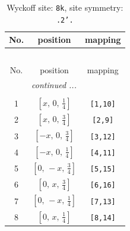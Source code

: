 \documentclass[fleqn,8pt]{jsarticle}
\begin{document}
\begin{longtable}{ccc}
\caption{Wyckoff site: {\tt 8k}, site symmetry: {\tt .2'.}}
 \\
 \hline \hline
No. & position & mapping \\ \hline \endfirsthead

\multicolumn{2}{l}{\tablename\ \thetable{}} \\
 \hline \hline
No. & position & mapping \\ \hline \endhead

 \hline \hline
\multicolumn{2}{r}{\footnotesize\it continued ...} \\ \endfoot

 \hline \hline
\multicolumn{2}{r}{} \\ \endlastfoot

1 & $\left[ x,\, 0,\, \frac{1}{4} \right]$ & {\tt [1,10]} \\ \hline
2 & $\left[ x,\, 0,\, \frac{3}{4} \right]$ & {\tt [2,9]} \\ \hline
3 & $\left[ - x,\, 0,\, \frac{3}{4} \right]$ & {\tt [3,12]} \\ \hline
4 & $\left[ - x,\, 0,\, \frac{1}{4} \right]$ & {\tt [4,11]} \\ \hline
5 & $\left[ 0,\, - x,\, \frac{3}{4} \right]$ & {\tt [5,15]} \\ \hline
6 & $\left[ 0,\, x,\, \frac{3}{4} \right]$ & {\tt [6,16]} \\ \hline
7 & $\left[ 0,\, - x,\, \frac{1}{4} \right]$ & {\tt [7,13]} \\ \hline
8 & $\left[ 0,\, x,\, \frac{1}{4} \right]$ & {\tt [8,14]} \\
\end{longtable}
\renewcommand{\arraystretch}{1.2}
\end{document}

